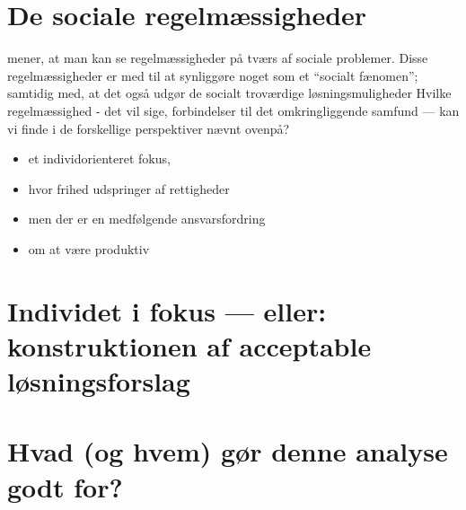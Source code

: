 \section{De sociale regelmæssigheder}

\citeauthor{scheurichPolicyArchaeologyNew1994} mener, at man kan se regelmæssigheder på tværs af sociale problemer.
Disse regelmæssigheder er med til at synliggøre noget som et “socialt fænomen”; samtidig med, at det også udgør de socialt troværdige løsningsmuligheder \cite[s. 301]{scheurichPolicyArchaeologyNew1994}
Hvilke regelmæssighed - det vil sige, forbindelser til det omkringliggende samfund — kan vi finde i de forskellige perspektiver nævnt ovenpå?

\begin{itemize}
  \item
    et individorienteret fokus, 
  \item
    hvor frihed udspringer af rettigheder
  \item
    men der er en medfølgende ansvarsfordring
  \item
    om at være produktiv
\end{itemize}

\section{Individet i fokus — eller: konstruktionen af acceptable løsningsforslag}

\section{Hvad (og hvem) gør denne analyse godt for?}
